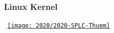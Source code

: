\subsubsection*{Linux Kernel}

\begin{frame}{\myframetitle}
	\vspace{28mm}~\hspace{-15mm}\href{https://dl.acm.org/doi/abs/10.1145/3382025.3414943}{\texttt{[image: 2020/2020-SPLC-Thuem]}}
\end{frame}




